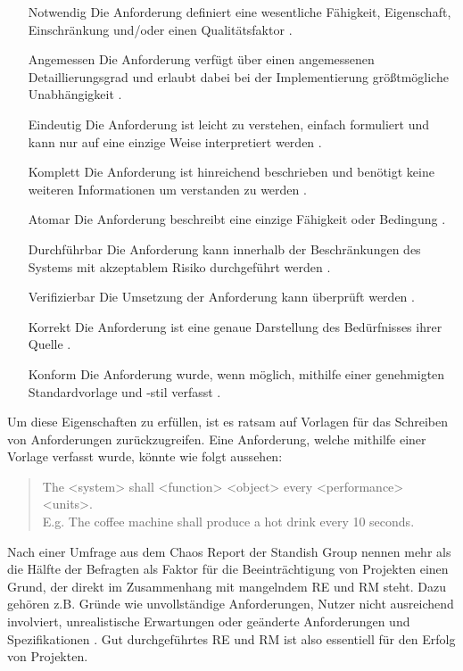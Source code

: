\begin{enumerate}[leftmargin=*,labelindent=16pt,font=\bfseries, nolistsep]
    \item[Notwendig] Die Anforderung definiert eine wesentliche Fähigkeit, Eigenschaft, Einschränkung und/oder einen Qualitätsfaktor \cite[vgl. S.12]{RE-ISO}.
    \item[Angemessen] Die Anforderung verfügt über einen angemessenen Detaillierungsgrad und erlaubt dabei bei der Implementierung größtmögliche Unabhängigkeit \cite[vgl. S.12]{RE-ISO}.
    \item[Eindeutig] Die Anforderung ist leicht zu verstehen, einfach formuliert und kann nur auf eine einzige Weise interpretiert werden \cite[vgl. S.12]{RE-ISO}.
    \item[Komplett] Die Anforderung ist hinreichend beschrieben und benötigt keine weiteren Informationen um verstanden zu werden \cite[vgl. S.12]{RE-ISO}.
    \item[Atomar] Die Anforderung beschreibt eine einzige Fähigkeit oder Bedingung \cite[vgl. S.12]{RE-ISO}.
    \item[Durchführbar] Die Anforderung kann innerhalb der Beschränkungen des Systems mit akzeptablem Risiko durchgeführt werden \cite[vgl. S.13]{RE-ISO}.
    \item[Verifizierbar] Die Umsetzung der Anforderung kann überprüft werden \cite[vgl. S.13]{RE-ISO}.
    \item[Korrekt] Die Anforderung ist eine genaue Darstellung des Bedürfnisses ihrer Quelle \cite[vgl. S.13]{RE-ISO}.
    \item[Konform] Die Anforderung wurde, wenn möglich, mithilfe einer genehmigten Standardvorlage und -stil verfasst \cite[vgl. S.13]{RE-ISO}.
\end{enumerate}

Um diese Eigenschaften zu erfüllen, ist es ratsam auf Vorlagen für das Schreiben von Anforderungen zurückzugreifen. Eine Anforderung, welche mithilfe
einer Vorlage verfasst wurde, könnte wie folgt aussehen:
\begin{quote}
    \glqq The <system> shall <function> <object> every <performance> <units>.\\
    E.g. The coffee machine shall produce a hot drink every 10 seconds. \grqq \cite[S.81]{DOORS}
\end{quote}

Nach einer Umfrage aus dem Chaos Report der Standish Group nennen mehr als die Hälfte der Befragten als Faktor für die Beeinträchtigung von Projekten
einen Grund, der direkt im Zusammenhang mit mangelndem \ac{RE} und \ac{RM} steht. Dazu gehören z.B. Gründe wie unvollständige Anforderungen, Nutzer nicht
ausreichend involviert, unrealistische Erwartungen oder geänderte Anforderungen und Spezifikationen \cite[vgl. S.5]{Chaos}. Gut durchgeführtes 
\ac{RE} und \ac{RM} ist also essentiell für den Erfolg von Projekten.

